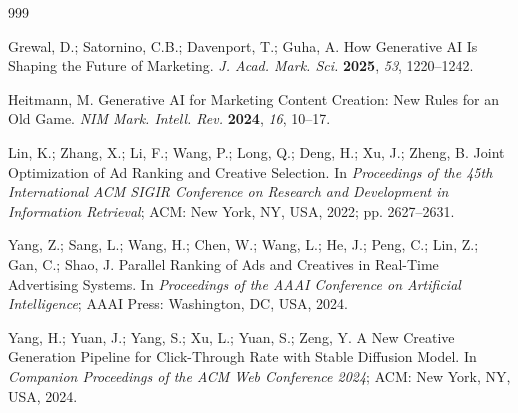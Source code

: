 \documentclass[applsci,article,submit,pdftex,moreauthors]{Definitions/mdpi}
\begin{document}
\begin{thebibliography}{999}

Grewal, D.; Satornino, C.B.; Davenport, T.; Guha, A.
How Generative AI Is Shaping the Future of Marketing.
\emph{J. Acad. Mark. Sci.} \textbf{2025}, \emph{53}, 1220--1242.

Heitmann, M.
Generative AI for Marketing Content Creation: New Rules for an Old Game.
\emph{NIM Mark. Intell. Rev.} \textbf{2024}, \emph{16}, 10--17.

Lin, K.; Zhang, X.; Li, F.; Wang, P.; Long, Q.; Deng, H.; Xu, J.; Zheng, B.
Joint Optimization of Ad Ranking and Creative Selection.
In \emph{Proceedings of the 45th International ACM SIGIR Conference on Research and Development in Information Retrieval}; ACM: New York, NY, USA, 2022; pp. 2627--2631.

Yang, Z.; Sang, L.; Wang, H.; Chen, W.; Wang, L.; He, J.; Peng, C.; Lin, Z.; Gan, C.; Shao, J.
Parallel Ranking of Ads and Creatives in Real-Time Advertising Systems.
In \emph{Proceedings of the AAAI Conference on Artificial Intelligence}; AAAI Press: Washington, DC, USA, 2024.

Yang, H.; Yuan, J.; Yang, S.; Xu, L.; Yuan, S.; Zeng, Y.
A New Creative Generation Pipeline for Click-Through Rate with Stable Diffusion Model.
In \emph{Companion Proceedings of the ACM Web Conference 2024}; ACM: New York, NY, USA, 2024.

\end{thebibliography}
\end{document}
